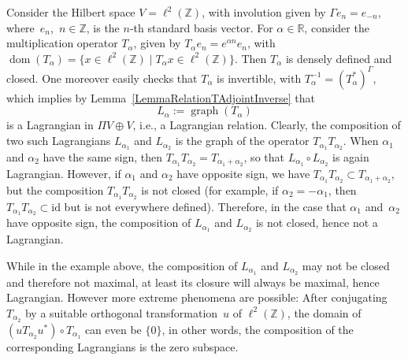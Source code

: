 \documentclass[10pt,a4paper]{amsart}
\numberwithin{equation}{section}
\DeclareMathOperator{\dom}{\mathrm{dom}}
\DeclareMathOperator{\graph}{\mathrm{graph}}
\newcommand{\R}{\mathbb{R}}
\newcommand{\Z}{\mathbb{Z}}
\begin{document}
\begin{Example} \label{ExampleNonComposable}
Consider the Hilbert space $V = \ell^2(\Z)$, with involution given by $\Gamma{e}_n = e_{-n}$, where~$e_n$,~$n \in \Z$, is the $n$-th standard basis vector.
For $\alpha \in \R$, consider the multiplication operator $T_\alpha$, given by $T_\alpha e_n = e^{\alpha n} e_n$, with $\dom(T_\alpha) = \big\{x \in \ell^2(\Z) \mid T_\alpha x \in \ell^2(\Z)\big\}$.
Then $T_\alpha$ is densely defined and closed.
One moreover easily checks that $T_\alpha$ is invertible, with $T^{-1}_\alpha =(T_\alpha^*)^\Gamma$, which implies by Lemma~\ref{LemmaRelationTAdjointInverse} that
\begin{equation*}
L_\alpha := \graph(T_\alpha)
\end{equation*}
is a Lagrangian in $\Pi V \oplus V$, i.e., a Lagrangian relation.
Clearly, the composition of two such Lagrangians $L_{\alpha_1}$ and $L_{\alpha_2}$ is the graph of the operator $T_{\alpha_1}T_{\alpha_2}$.
 When $\alpha_1$ and $\alpha_2$ have the same sign, then $T_{\alpha_1} T_{\alpha_2} = T_{\alpha_1+\alpha_2}$, so that $L_{\alpha_1} \circ L_{\alpha_2}$ is again Lagrangian.
 However, if $\alpha_1$ and $\alpha_2$ have opposite sign, we have $T_{\alpha_1}T_{\alpha_2} \subset T_{\alpha_1+\alpha_2}$, but the composition $T_{\alpha_1} T_{\alpha_2}$ is not closed (for example, if $\alpha_2 = - \alpha_1$, then $T_{\alpha_1} T_{\alpha_2} \subset \mathrm{id}$ but is not everywhere defined). Therefore, in the case that $\alpha_1$ and~$\alpha_2$ have opposite sign, the composition of $L_{\alpha_1}$ and $L_{\alpha_2}$ is not closed, hence not a Lagrangian.
 \end{Example}

 While in the example above, the composition of $L_{\alpha_1}$ and $L_{\alpha_2}$ may not be closed and therefore not maximal, at least its closure will always be maximal, hence Lagrangian.
 However more extreme phenomena are possible: After conjugating $T_{\alpha_2}$ by a suitable orthogonal transformation~$u$ of $\ell^2(\Z)$, the domain of $(u T_{\alpha_2}u^*) \circ T_{\alpha_1}$ can even be $\{0\}$, in other words, the composition of the corresponding Lagrangians is the zero subspace.
\end{document}
